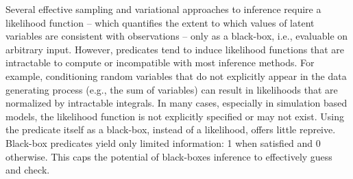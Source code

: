 



Several effective sampling  \citep{andrieu2003introduction} and variational  \citep{jordan1999introduction, ranganath2014black} approaches to inference require a likelihood function -- which quantifies the extent to which values of latent variables are consistent with observations -- only as a black-box, i.e., evaluable on arbitrary input.
However, predicates tend to induce likelihood functions that are intractable to compute or incompatible with most inference methods.
For example, conditioning random variables that do not explicitly appear in the data generating process (e.g., the sum of variables) can result in likelihoods that are normalized by intractable integrals.	
In many cases, especially in simulation based models, the likelihood function is not explicitly specified or may not exist.
Using the predicate itself as a black-box, instead of a likelihood, offers little repreive.
Black-box predicates yield only limited information: 1 when satisfied and 0 otherwise.
This caps the potential of black-boxes inference to effectively guess and check.

